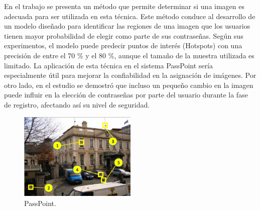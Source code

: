 \documentclass[12pt]{report}
\begin{document}
	En el trabajo \cite{18} se presenta un método que permite determinar si una imagen es adecuada para ser utilizada en esta técnica. Este método conduce al desarrollo de un modelo diseñado para identificar las regiones de una imagen que los usuarios tienen mayor probabilidad de elegir como parte de sus contraseñas. Según sus experimentos, el modelo puede predecir puntos de interés (Hotspots) con una precisión de entre el 70 \% y el 80 \%, aunque el tamaño de la muestra utilizada es limitado. La aplicación de esta técnica en el sistema PassPoint sería especialmente útil para mejorar la confiabilidad en la asignación de imágenes. Por otro lado, en el estudio \cite{19} se demostró que incluso un pequeño cambio en la imagen puede influir en la elección de contraseñas por parte del usuario durante la fase de registro, afectando así su nivel de seguridad.   
		\begin{figure}[ht]
		\centering
		\includegraphics[width=0.5\textwidth]{passpoint.png}
		\caption{PassPoint.}
		\label{fig:PassPoint}
	\end{figure}
	 

	
\end{document}
